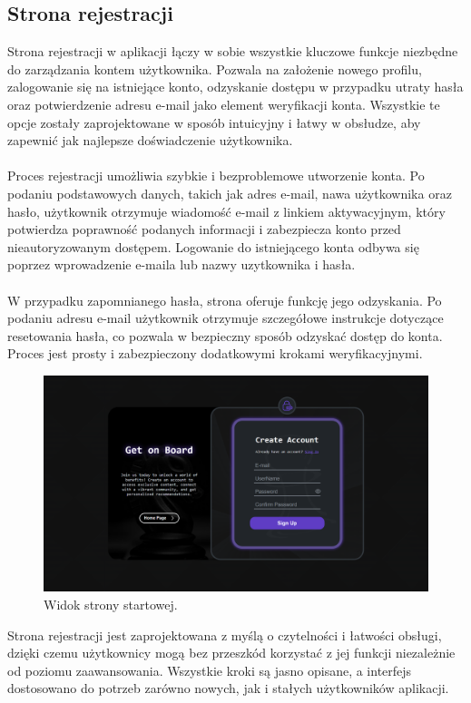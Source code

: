 \documentclass[12pt,a4paper]{article}
\begin{document}
\newpage
\subsection{Strona rejestracji}
Strona rejestracji w aplikacji łączy w sobie wszystkie kluczowe funkcje niezbędne do zarządzania kontem użytkownika. Pozwala na założenie nowego profilu, zalogowanie się na istniejące konto, odzyskanie dostępu w przypadku utraty hasła oraz potwierdzenie adresu e-mail jako element weryfikacji konta. Wszystkie te opcje zostały zaprojektowane w sposób intuicyjny i łatwy w obsłudze, aby zapewnić jak najlepsze doświadczenie użytkownika.
\\\\
Proces rejestracji umożliwia szybkie i bezproblemowe utworzenie konta. Po podaniu podstawowych danych, takich jak adres e-mail, nawa użytkownika oraz hasło, użytkownik otrzymuje wiadomość e-mail z linkiem aktywacyjnym, który potwierdza poprawność podanych informacji i zabezpiecza konto przed nieautoryzowanym dostępem. Logowanie do istniejącego konta odbywa się poprzez wprowadzenie e-maila lub nazwy uzytkownika i hasła.
\\\\
W przypadku zapomnianego hasła, strona oferuje funkcję jego odzyskania. Po podaniu adresu e-mail użytkownik otrzymuje szczegółowe instrukcje dotyczące resetowania hasła, co pozwala w bezpieczny sposób odzyskać dostęp do konta. Proces jest prosty i zabezpieczony dodatkowymi krokami weryfikacyjnymi.

\begin{figure}[h!]
    \centering
    \includegraphics[width=1\textwidth]{zdj/ins_reg.png}
    \caption{Widok strony startowej.}
\end{figure}

Strona rejestracji jest zaprojektowana z myślą o czytelności i łatwości obsługi, dzięki czemu użytkownicy mogą bez przeszkód korzystać z jej funkcji niezależnie od poziomu zaawansowania. Wszystkie kroki są jasno opisane, a interfejs dostosowano do potrzeb zarówno nowych, jak i stałych użytkowników aplikacji.
\end{document}
